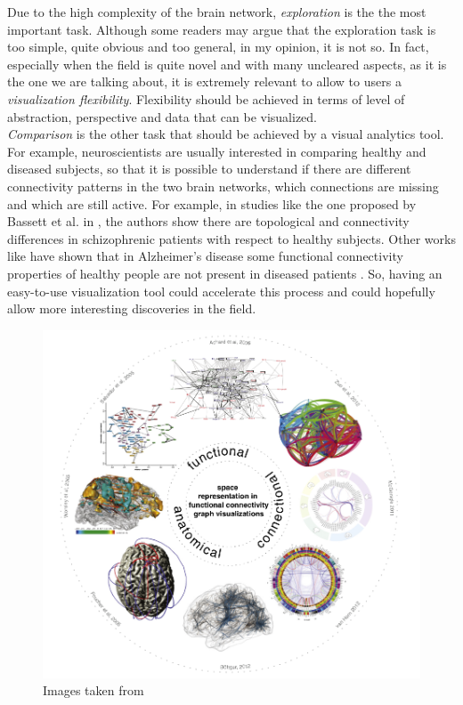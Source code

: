 \documentclass{article}
\begin{document}
\begin{multicols}{2}
Due to the high complexity of the brain network, \textit{exploration} is the the most important task. Although some readers may argue that the exploration task is too simple, quite obvious and too general, in my opinion, it is not so. In fact, especially when the field is quite novel and with many uncleared aspects, as it is the one we are talking about, it is extremely relevant to allow to users a \textit{visualization flexibility}. Flexibility should be achieved in terms of level of abstraction, perspective and data that can be visualized. \\

\textit{Comparison} is the other task that should be achieved by a visual analytics tool. For example, neuroscientists are usually interested in comparing healthy and diseased subjects, so that it is possible to understand if there are different connectivity patterns in the two brain networks, which connections are missing and which are still active. For example, in studies like the one proposed by Bassett et al. in \cite{hierarchicalOrganization}, the authors show there are topological and connectivity differences in schizophrenic patients with respect to healthy subjects. Other works like \cite{alzheimer} have shown that in Alzheimer's disease some functional connectivity properties of healthy people are not present in diseased patients . So, having an easy-to-use visualization tool could accelerate this process and could hopefully allow more interesting discoveries in the field.

\begin{figure}[ht]
\centering
\includegraphics[width = 1.8\columnwidth]{taxonomy}
\caption{Images taken from \cite{visualizingHumanConnectome}}
\label{fig:taxonomy}
\end{figure}


\end{multicols}
\end{document}
